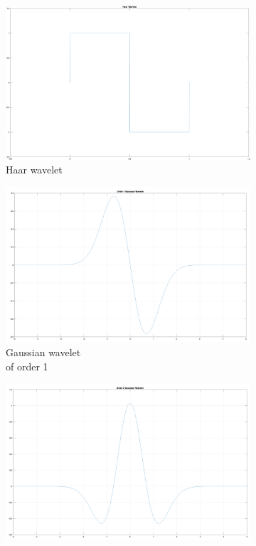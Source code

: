 \begin{enumerate}
	\begin{figure}
		\centering
		\begin{subfigure}{.4\textwidth}
		  \centering
		  \includegraphics[width=\linewidth]{Figures/haar.png}
		  \caption{Haar wavelet}
		  \label{Haar}
		\end{subfigure}
		\hfill
		\begin{subfigure}{.4\textwidth}
			\centering
			\includegraphics[width=\linewidth]{Figures/order1gaussian.png}
			\caption{Gaussian wavelet \\of order 1}
			\label{order1}
		\end{subfigure}
		\hfill
		\begin{subfigure}{.4\textwidth}
		  \centering
		  \includegraphics[width=\linewidth]{Figures/order2gaussian.png}

\end{subfigure}
\end{figure}
\end{enumerate}
